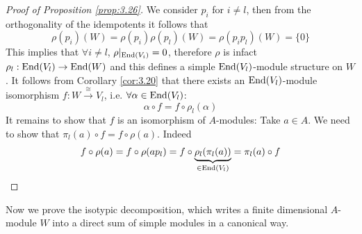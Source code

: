 \documentclass[twoside = false,	%
		headsepline,		%
		parskip = true,
		]{scrbook}						%
\begin{document}
\begin{proof}[Proof of Proposition \ref{prop:3.26}]
            We consider $p_i$ for $i \neq l$, then from the orthogonality of the idempotents it follows that
            \begin{equation*}
                \rho(p_i)(W) = \rho(p_i)\rho(p_l)(W) = \rho(p_ip_l)(W) = \{0\}
            \end{equation*}
            This implies that $\forall i \neq l$, $\rho|_{\mathrm{End}(V_i)} = 0$, therefore $\rho$ is infact $\rho_l:\mathrm{End}(V_l) \to \mathrm{End}(W)$ and this defines a simple $\mathrm{End}(V_l)$-module structure on $W$. It follows from Corollary \ref{cor:3.20} that there exists an $\mathrm{End}(V_l)$-module isomorphism $f: W \xrightarrow{\cong} V_l$, i.e. $\forall \alpha \in \mathrm{End}(V_l)$:
            \begin{equation*}
                \alpha \circ f = f \circ \rho_l(\alpha)
            \end{equation*}
            It remains to show that $f$ is an isomorphism of $A$-modules: Take $a \in A$. We need to show that $\pi_l(a) \circ f = f \circ \rho(a)$. Indeed
            \begin{equation*}
                f \circ \rho(a) = f \circ \rho(a p_l) = f \circ \underbrace{\rho_l(\pi_l(a))}_{\in \mathrm{End}(V_l)} = \pi_l(a) \circ f
            \end{equation*}
        \end{proof}

        Now we prove the isotypic decomposition, which writes a finite dimensional $A$-module $W$ into a direct sum of simple modules in a canonical way.
\end{document}
